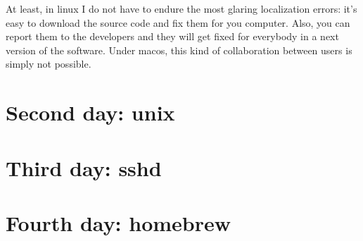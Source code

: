 At least, in linux I do not have to endure the most glaring localization
errors: it's easy to download the source code and fix them for you computer.
Also, you can report them to the developers and they will get fixed for
everybody in a next version of the software.  Under macos, this kind of
collaboration between users  is simply not possible.


\section*{Second day: unix}

\section*{Third day: sshd}

\section*{Fourth day: homebrew}



